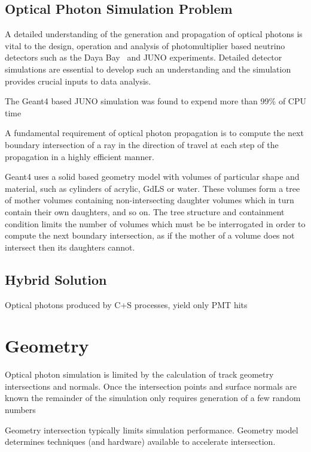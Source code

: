 \documentclass[a4paper]{jpconf}
\begin{document}
\subsection{Optical Photon Simulation Problem}

A detailed understanding of the generation and propagation of optical 
photons is vital to the design, operation and analysis of photomultiplier
based neutrino detectors such as the Daya Bay~\cite{dyb} and JUNO\cite{juno} experiments. 
Detailed detector simulations are essential to develop such an understanding and the 
simulation provides crucial inputs to data analysis.  

The Geant4 based JUNO simulation was found to expend more than 99\% of CPU time
 

A fundamental requirement of optical photon propagation is to compute 
the next boundary intersection of a ray in the direction of travel 
at each step of the propagation in a highly efficient manner.

Geant4 uses a solid based geometry model with volumes of particular shape and material, 
such as cylinders of acrylic, GdLS or water. These volumes form a tree of mother volumes 
containing non-intersecting daughter volumes which in turn contain their own daughters, and so on. 
The tree structure and containment condition limits the number of volumes which 
must be be interrogated in order to compute the next boundary intersection, as if the 
mother of a volume does not intersect then its daughters cannot.

%
%

\subsection{Hybrid Solution}

Optical photons produced by C+S processes, yield only PMT hits


\section{Geometry}

Optical photon simulation is limited by the calculation of track geometry intersections and normals.
Once the intersection points and surface normals are known the remainder of the 
simulation only requires generation of a few random numbers 

Geometry intersection typically limits simulation performance. Geometry model
determines techniques (and hardware) available to accelerate intersection.
\end{document}

